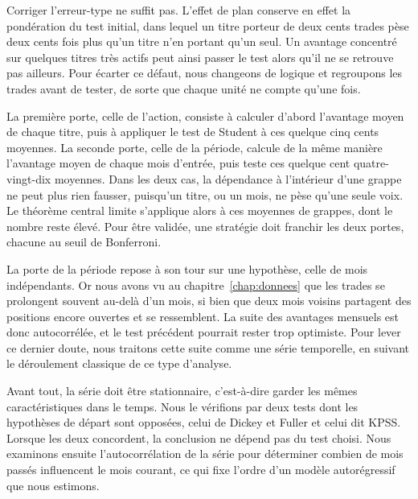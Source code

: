 
Corriger l'erreur-type ne suffit pas. L'effet de plan conserve en effet
la pondération du test initial, dans lequel un titre porteur de deux
cents trades pèse deux cents fois plus qu'un titre n'en portant qu'un
seul. Un avantage concentré sur quelques titres très actifs peut ainsi
passer le test alors qu'il ne se retrouve pas ailleurs. Pour écarter ce
défaut, nous changeons de logique et regroupons les trades avant de
tester, de sorte que chaque unité ne compte qu'une fois.

La première porte, celle de l'action, consiste à calculer d'abord
l'avantage moyen de chaque titre, puis à appliquer le test de Student à
ces quelque cinq cents moyennes. La seconde porte, celle de la période,
calcule de la même manière l'avantage moyen de chaque mois d'entrée,
puis teste ces quelque cent quatre-vingt-dix moyennes. Dans les deux
cas, la dépendance à l'intérieur d'une grappe ne peut plus rien fausser,
puisqu'un titre, ou un mois, ne pèse qu'une seule voix. Le théorème
central limite s'applique alors à ces moyennes de grappes, dont le
nombre reste élevé. Pour être validée, une stratégie doit franchir les
deux portes, chacune au seuil de Bonferroni.


La porte de la période repose à son tour sur une hypothèse, celle de
mois indépendants. Or nous avons vu au chapitre~\ref{chap:donnees} que
les trades se prolongent souvent au-delà d'un mois, si bien que deux
mois voisins partagent des positions encore ouvertes et se ressemblent.
La suite des avantages mensuels est donc autocorrélée, et le test
précédent pourrait rester trop optimiste. Pour lever ce dernier doute,
nous traitons cette suite comme une série temporelle, en suivant le
déroulement classique de ce type d'analyse.

Avant tout, la série doit être stationnaire, c'est-à-dire garder les
mêmes caractéristiques dans le temps. Nous le vérifions par deux tests
dont les hypothèses de départ sont opposées, celui de Dickey et Fuller
et celui dit KPSS. Lorsque les deux concordent, la conclusion ne dépend
pas du test choisi. Nous examinons ensuite l'autocorrélation de la série
pour déterminer combien de mois passés influencent le mois courant, ce
qui fixe l'ordre d'un modèle autorégressif que nous estimons.


